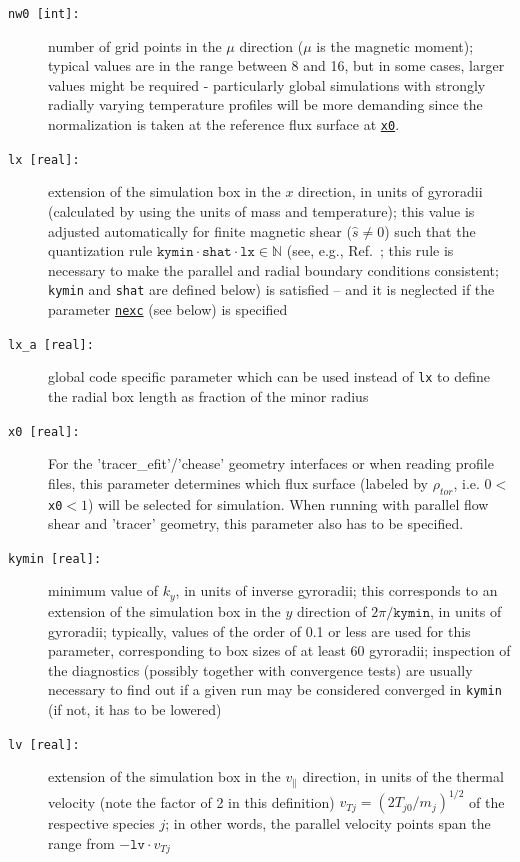 \documentclass[12pt]{article}
\begin{document}
\begin{description}
\item[\hypertarget{nw0}{\tt nw0 [int]:}] number of grid points in the $\mu$ direction ($\mu$ is the magnetic moment);
typical values are in the range between 8 and 16, but in some cases, larger values might be required -
particularly global simulations with strongly radially varying temperature profiles will
be more demanding since the normalization is taken at the reference flux surface at \hyperlink{x0}{\tt x0}.
\item[\texttt{lx [real]:}] extension of the simulation box in the $x$ direction, in units of gyroradii
(calculated by using the units of mass and temperature); this value is adjusted automatically for
finite magnetic shear ($\hat s\ne 0$) such that the quantization rule
$\texttt{kymin}\cdot\texttt{shat}\cdot\texttt{lx}\in\mathbb{N}$ (see, e.g., Ref.~\cite{beer}; this rule is
necessary to make the parallel and radial boundary conditions consistent; \texttt{kymin} and \texttt{shat}
are defined below) is satisfied -- and it is neglected if the parameter \hyperlink{nexc}{\texttt{nexc}} (see below) is specified
\item[\texttt{lx\_a [real]:}] global code specific parameter which can be used instead of {\tt lx} to define
the radial box length as fraction of the minor radius
\item[\hypertarget{x0}{\tt x0 [real]:}] For the 'tracer\_efit'/'chease' geometry interfaces or when reading profile files,
this parameter determines which flux surface (labeled by $\rho_{tor}$, i.e. $0<$\texttt{x0}$<1$) will be selected for simulation. When
running with parallel flow shear and 'tracer' geometry, this parameter also has to be specified.
\item[\texttt{kymin [real]:}] minimum value of $k_y$, in units of inverse gyroradii; this corresponds to
an extension of the simulation box in the $y$ direction of $2\pi/\texttt{kymin}$, in units of gyroradii;
typically, values of the order of 0.1 or less are used for this parameter, corresponding to box sizes of
at least 60 gyroradii; inspection of the \gene diagnostics (possibly together with convergence tests) are
usually necessary to find out if a given run may be considered converged in \texttt{kymin} (if not, it
has to be lowered)
\item[\texttt{lv [real]:}] extension of the simulation box in the $v_\|$ direction, in units of the
thermal velocity (note the factor of 2 in this definition) $v_{Tj}=(2T_{j0}/m_j)^{1/2}$ of the respective
species $j$; in other words, the parallel velocity points span the range from $- \mathtt{lv} \cdot v_{Tj}$

\end{description}
\end{document}

